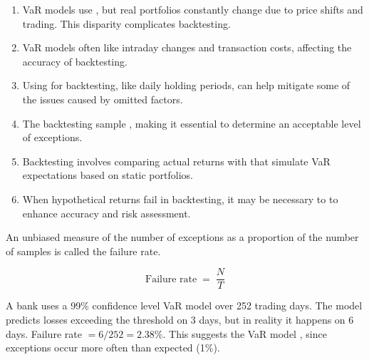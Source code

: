 \begin{enumerate}[label=\textbf{\alph*.}]
\item VaR models use , but real portfolios constantly change due to
      price shifts and trading. This disparity complicates backtesting.
\item VaR models often  like intraday changes and transaction
      costs, affecting the accuracy of backtesting.
\item Using  for backtesting, like daily holding periods, can help
      mitigate some of the issues caused by omitted factors.
\item The backtesting sample , making it essential to
      determine an acceptable level of exceptions.
\item Backtesting involves comparing actual returns with  that
      simulate VaR expectations based on static portfolios.
\item When hypothetical returns fail in backtesting, it may be necessary to  to enhance accuracy and risk assessment.
\end{enumerate}


\begin{mrdefbox}[title={Failure rate}]
An unbiased measure of the number of exceptions as a proportion of the number of samples is
called the failure rate.
\end{mrdefbox}

\begin{mrfmlbox}
\[ \text{Failure rate} \;=\; \frac{N}{T} \]
\end{mrfmlbox}

\begin{mrexbox}[title={Example --- failure rate}]
A bank uses a 99\% confidence level VaR model over 252 trading days. The model predicts losses
exceeding the threshold on 3 days, but in reality it happens on 6 days.
\tcblower
\small
Failure rate $= 6 / 252 = \mathbf{2.38\%}$. This suggests the VaR model , since exceptions occur more often than expected (1\%).
\end{mrexbox}

